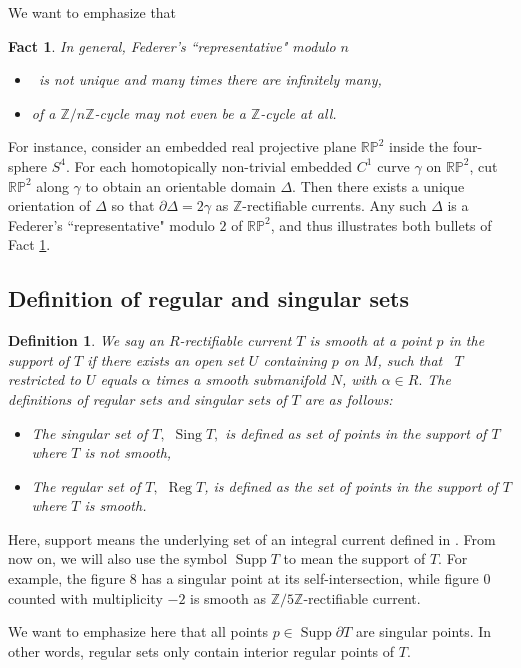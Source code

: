 \documentclass[11pt,a4paper]{amsart}
\numberwithin{equation}{section}
\newcommand{\supp}{\operatorname{Supp}}
\newcommand{\ai}{\alpha}
\newcommand{\sing}{\operatorname{Sing}}
\newcommand{\ga}{\gamma}
\newcommand{\De}{\Delta}
\newcommand{\pd}{\partial}
\newcommand{\Z}{\mathbb{Z}}
\theoremstyle{plain}
\newtheorem{fact}{Fact}[subsection]
\newtheorem{defn}{Definition}[subsection]
\theoremstyle{definition}
\numberwithin{equation}{subsection}
\begin{document}
	We want to emphasize that\begin{fact}\label{fctfce}In general,
		Federer's ``representative" modulo $n$
		\begin{itemize}
			\item  is not unique and many times there are infinitely many,  
			\item of a $\Z/n\Z$-cycle may not even be a $\Z$-cycle at all. 
		\end{itemize}
	\end{fact}
	For instance, consider an embedded real projective plane $\mathbb{RP}^2$ inside the four-sphere $S^4.$ For each homotopically non-trivial embedded $C^1$ curve $\ga$ on $\mathbb{RP}^2$, cut $\mathbb{RP}^2$ along $\ga$ to obtain an orientable domain $\De.$ Then there exists a unique orientation of $\De$ so that $\pd \De=2\ga$ as $\Z$-rectifiable currents. Any such $\De$ is a Federer's ``representative" modulo $2$ of $\mathbb{RP}^2$, and thus illustrates both bullets of Fact \ref{fctfce}.
	\subsection{Definition of regular and singular sets}
		\begin{defn}\label{defnsm}
	We say an $R$-rectifiable current $T$ is smooth at a point $p$ in the support of $T$ if there exists an open set $U$ containing $p$ on $M$, such that  $T$ restricted to $U$ equals $\ai$ times a smooth submanifold $N$, with $\ai\in R.$ The definitions of regular sets and singular sets of $T$ are as follows:
	\begin{itemize}
		\item The singular set of $T,$ $\sing T,$ is defined as set of points in the support of $T$ where $T$ is not smooth,		
		\item 
		The regular set of $T,$ $\operatorname{Reg}T$, is defined as the set of points in the support of $T$ where $T$ is smooth. 
	\end{itemize}
	\end{defn} 
	Here, support means the underlying set of an integral current defined in \cite[Section 4.1.28(4)]{HF}. From now on, we will also use the symbol $\supp T$ to mean the support of $T.$ 
	For example, the figure $8$ has a singular point at its self-intersection, while figure $0$ counted with multiplicity $-2$ is smooth as $\Z/5\Z$-rectifiable current.
	
	We want to emphasize here that all points $p\in\supp \pd T$ are singular points. In other words, regular sets only contain interior regular points of $T$.
\end{document}
